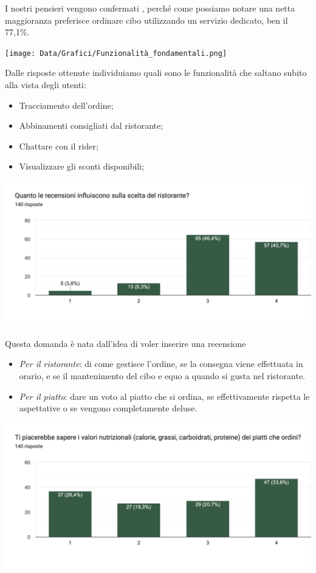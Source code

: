 \documentclass{article}
\begin{document}
I nostri pensieri vengono confermati , perché come possiamo notare una netta maggioranza preferisce ordinare cibo utilizzando un servizio dedicato, ben il 77,1\%.\par \vspace{1cm}
\texttt{[image: Data/Grafici/Funzionalità\_fondamentali.png]}\par
Dalle risposte ottenute individuiamo quali sono le funzionalità che saltano subito alla vista degli utenti:
\par \begin{itemize}
    \item Tracciamento dell'ordine;
    \item Abbinamenti consigliati dal ristorante;
    \item Chattare con il rider;
    \item Visualizzare gli sconti disponibili;
\end{itemize}   \vspace{1cm} \par
\includegraphics[width=\textwidth]{Data/Grafici/recensioni_influiscono.png}\par
Questa domanda è nata dall'idea di voler inserire una recensione 
    \begin{itemize}
        \item \textit{Per il ristorante}: di come gestisce l'ordine, se la consegna viene effettuata in orario, e se il mantenimento del cibo e equo a quando si gusta nel ristorante.
        \item \textit{Per il piatto}: dare un voto al piatto che si ordina, se effettivamente rispetta le aspettative o se vengono completamente deluse.
    \end{itemize}
    \par \vspace{1cm}\includegraphics[width=\textwidth]{Data/Grafici/Valori_nutrizionali.png}\par
\end{document}
